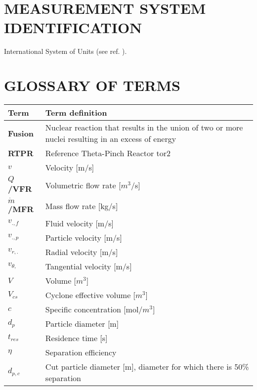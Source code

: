 \newpage
\section*{MEASUREMENT SYSTEM IDENTIFICATION}
International System of Units (see ref. \cite{units}).

\section*{GLOSSARY OF TERMS}
\begin{table}[!h]
    \centering
    \begin{tabular}{|p{3.5cm}|p{11.5cm}|}
        \hline
        \rule[-0.3cm]{0pt}{0.8cm} \textbf{Term} & \textbf{Term definition} \\
        \hline
        \rule[-0.2cm]{0pt}{0.6cm} \textbf{Fusion} &  Nuclear reaction that results in the union of two or more nuclei resulting in an excess of energy\\
        \hline
        \rule[-0.2cm]{0pt}{0.6cm} \textbf{RTPR} &  Reference Theta-Pinch Reactor tor2\\
        \hline
        \rule[-0.2cm]{0pt}{0.6cm} \textbf{$v$} &Velocity [m/s]  \\
        \hline
        \rule[-0.2cm]{0pt}{0.6cm} \textbf{$Q$/VFR} & Volumetric flow rate [$m^3$/s]  \\
        \hline
        \rule[-0.2cm]{0pt}{0.6cm} \textbf{$\dot{m}$/MFR} & Mass flow rate [kg/s]  \\
        \hline
        \rule[-0.2cm]{0pt}{0.6cm} \textbf{$v_{.,f}$} & Fluid velocity [m/s]  \\
		\hline
		\rule[-0.2cm]{0pt}{0.6cm} \textbf{$v_{.,p}$} & Particle velocity [m/s] \\
       \hline
		\rule[-0.2cm]{0pt}{0.6cm} \textbf{$v_{r,.}$} & Radial velocity [m/s]  \\
       \hline
		\rule[-0.2cm]{0pt}{0.6cm} \textbf{$v_{\theta,}$} &  Tangential velocity [m/s] \\
       \hline
		\rule[-0.2cm]{0pt}{0.6cm} \textbf{$V$} &  Volume [$m^3$] \\
         \hline 
		\rule[-0.2cm]{0pt}{0.6cm} \textbf{$V_{cs}$} & Cyclone effective volume [$m^3$] \\
        \hline 
		\rule[-0.2cm]{0pt}{0.6cm} \textbf{$c$} & Specific concentration [mol/$m^3$]  \\
        \hline 
		\rule[-0.2cm]{0pt}{0.6cm} \textbf{$d_{p}$} & Particle diameter [m] \\
        \hline 
		\rule[-0.2cm]{0pt}{0.6cm} \textbf{$t_{res}$} & Residence time [s] \\
        \hline 
		\rule[-0.2cm]{0pt}{0.6cm} \textbf{ $\eta$} &  Separation efficiency \\
        \hline 
        \rule[-0.2cm]{0pt}{0.6cm} \textbf{ $d_{p,c}$} & Cut particle diameter [m], diameter for which there is 50\% separation \\
        \hline 
    \end{tabular}

\end{table}

\newpage